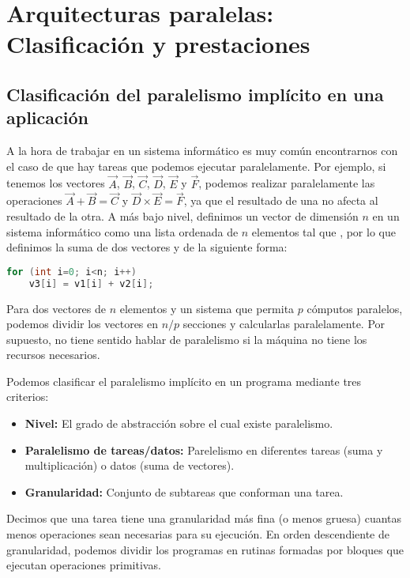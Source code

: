 \chapter{Arquitecturas paralelas: Clasificación y prestaciones}

\section{Clasificación del paralelismo implícito en una aplicación}

A la hora de trabajar en un sistema informático es muy común encontrarnos con el caso de que hay tareas que podemos ejecutar paralelamente.
Por ejemplo, si tenemos los vectores $\vec{A}$, $\vec{B}$, $\vec{C}$, $\vec{D}$, $\vec{E}$ y $\vec{F}$, podemos realizar paralelamente las operaciones $\vec{A}+\vec{B}=\vec{C}$ y $\vec{D}\times\vec{E}=\vec{F}$, ya que el resultado de una no afecta al resultado de la otra.
A más bajo nivel, definimos un vector de dimensión $n$ en un sistema informático como una lista ordenada de $n$ elementos tal que , por lo que definimos la suma de dos vectores  y  de la siguiente forma:

\begin{lstlisting}[language=C]
for (int i=0; i<n; i++)
	v3[i] = v1[i] + v2[i];
\end{lstlisting}

Para dos vectores de $n$ elementos y un sistema que permita $p$ cómputos paralelos, podemos dividir los vectores en $n/p$ secciones y calcularlas paralelamente.
Por supuesto, no tiene sentido hablar de paralelismo si la máquina no tiene los recursos necesarios.

Podemos clasificar el paralelismo implícito en un programa mediante tres criterios:

\begin{itemize}
	\item\textbf{Nivel:} El grado de abstracción sobre el cual existe paralelismo.
	\item\textbf{Paralelismo de tareas/datos:} Parelelismo en diferentes tareas (suma y multiplicación) o datos (suma de vectores).
	\item\textbf{Granularidad:} Conjunto de subtareas que conforman una tarea.
\end{itemize}

Decimos que una tarea tiene una granularidad más fina (o menos gruesa) cuantas menos operaciones sean necesarias para su ejecución.
En orden descendiente de granularidad, podemos dividir los programas en rutinas formadas por bloques que ejecutan operaciones primitivas.

